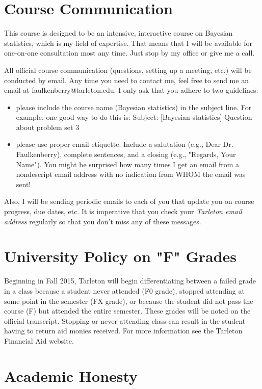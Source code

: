 \documentclass[10pt]{article}
\begin{document}
\section*{Course Communication}
\label{sec:org983be45}

This course is designed to be an intensive, interactive course on Bayesian statistics, which is my field of expertise.  That means that I will be available for one-on-one consultation most any time.  Just stop by my office or give me a call.

All official course communication (questions, setting up a meeting, etc.) will be conducted by email.  Any time you need to contact me, feel free to send me an email at faulkenberry@tarleton.edu.  I only ask that you adhere to two guidelines:
\begin{itemize}
\item please include the course name (Bayesian statistics) in the subject line.  For example, one good way to do this is:  Subject: [Bayesian statistics] Question about problem set 3
\item please use proper email etiquette.  Include a salutation (e.g., Dear Dr. Faulkenberry), complete sentences, and a closing (e.g., "Regards, Your Name").  You might be surprised how many times I get an email from a nondescript email address with no indication from WHOM the email was sent!
\end{itemize}

Also, I will be sending periodic emails to each of you that update you on course progress, due dates, etc.  It is imperative that you check your \emph{Tarleton email address} regularly so that you don't miss any of these messages.

\section*{University Policy on "F" Grades}
\label{sec:orga2b44cf}
Beginning in Fall 2015, Tarleton will begin differentiating between a failed grade in a class because a student never attended (F0 grade), stopped attending at some point in the semester (FX grade), or because the student did not pass the course (F) but attended the entire semester. These grades will be noted on the official transcript. Stopping or never attending class can result in the student having to return aid monies received.  For more information see the Tarleton Financial Aid website.

\section*{Academic Honesty}
\label{sec:org872a837}
\end{document}
